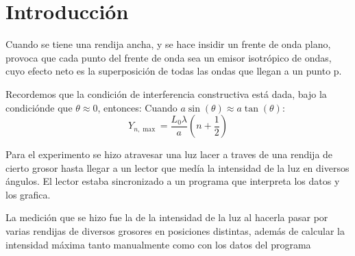 \section{Introducción}

Cuando se tiene una rendija ancha, y se hace insidir un frente de onda plano,
    provoca que cada punto del frente de onda sea un emisor isotrópico de ondas,
    cuyo efecto neto es la superposición de todas las ondas que llegan a un punto p.

    Recordemos que la condición de interferencia constructiva está 
dada, bajo la condiciónde que $\theta \approx 0$, entonces:
Cuando $a\sin(\theta) \approx a\tan(\theta)$:
\[
    Y_{n,\max} = \frac{L_0\lambda}{a} \left(n + \frac{1}{2}\right)
\]

Para el experimento se hizo atravesar una luz lacer a traves de una rendija de cierto grosor hasta llegar a un lector que medía la intensidad de la luz en diversos ángulos. El lector estaba sincronizado a un programa que interpreta los datos y los grafica.

La medición que se hizo fue la de la intensidad de la luz al hacerla pasar por varias rendijas de diversos grosores en posiciones distintas, además de calcular la intensidad máxima tanto manualmente como con los datos del programa